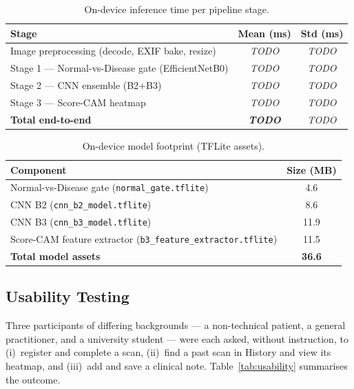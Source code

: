 \begin{table}[H]
\centering
\caption{On-device inference time per pipeline stage.}
\label{tab:inference_time}
\begin{tabular}{|l|c|c|}
\hline
\textbf{Stage} & \textbf{Mean (ms)} & \textbf{Std (ms)} \\ \hline
Image preprocessing (decode, EXIF bake, resize) & \textit{TODO} & \textit{TODO} \\ \hline
Stage 1 — Normal-vs-Disease gate (EfficientNetB0) & \textit{TODO} & \textit{TODO} \\ \hline
Stage 2 — CNN ensemble (B2+B3) & \textit{TODO} & \textit{TODO} \\ \hline
Stage 3 — Score-CAM heatmap & \textit{TODO} & \textit{TODO} \\ \hline
\textbf{Total end-to-end} & \textbf{\textit{TODO}} & \textit{TODO} \\ \hline
\end{tabular}
\end{table}


\begin{table}[H]
\centering
\caption{On-device model footprint (TFLite assets).}
\label{tab:storage}
\begin{tabular}{|l|c|}
\hline
\textbf{Component} & \textbf{Size (MB)} \\ \hline
Normal-vs-Disease gate (\texttt{normal\_gate.tflite}) & 4.6 \\ \hline
CNN B2 (\texttt{cnn\_b2\_model.tflite})                & 8.6 \\ \hline
CNN B3 (\texttt{cnn\_b3\_model.tflite})                & 11.9 \\ \hline
Score-CAM feature extractor (\texttt{b3\_feature\_extractor.tflite}) & 11.5 \\ \hline
\textbf{Total model assets} & \textbf{36.6} \\ \hline
\end{tabular}
\end{table}

\subsection{Usability Testing}

Three participants of differing backgrounds — a non-technical patient, a general
practitioner, and a university student — were each asked, without instruction,
to (i)~register and complete a scan, (ii)~find a past scan in History and view
its heatmap, and (iii)~add and save a clinical note.
Table~\ref{tab:usability} summarises the outcome.

